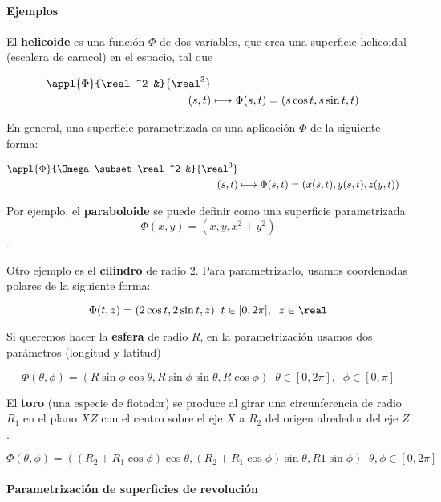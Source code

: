 \paragraph{Ejemplos}

\label{Helicoide}
El \textbf{helicoide} es una función $\Phi$ de dos variables, que crea una superficie helicoidal (escalera de caracol) en el espacio, tal que 

\begin{align*} \appl{\Phi}{\real^2 &}{\real^3} \\
 (s,t) &\longmapsto \Phi(s,t) = (s\cos t, s\sin t, t) \end{align*}
 

En general, una superficie parametrizada es una aplicación $\Phi$ de la siguiente forma:

\begin{align*} \appl{\Phi}{\Omega \subset \real^2 &}{\real^3} \\
 (s,t) &\longmapsto \Phi(s,t) = (x(s,t), y(s,t), z(y,t)) \end{align*}

Por ejemplo, el \textbf{paraboloide} se puede definir como una superficie parametrizada \[\Phi(x,y) = (x,y,x^2+y^2)\].

Otro ejemplo es el \textbf{cilindro} de radio 2. Para parametrizarlo, usamos coordenadas polares de la siguiente forma:

\[ \Phi(t,z) = (2\cos t, 2\sin t, z)\;\;t\in [0, 2\pi],\;\; z\in \real \]

Si queremos hacer la \textbf{esfera} de radio $R$, en la parametrización usamos dos parámetros (longitud y latitud)

\[ \Phi(\theta, \phi) = (R\sin\phi\cos\theta, R\sin\phi\sin\theta, R\cos\phi)\;\; \theta\in[0,2\pi],\;\;\phi\in[0, \pi] \]

El \textbf{toro} (una especie de flotador) se produce al girar una circunferencia de radio $R_1$ en el plano $XZ$ con el centro sobre el eje $X$ a $R_2$ del origen alrededor del eje $Z$.

\[ \Phi(\theta, \phi) = ((R_2+R_1\cos\phi)\cos\theta,(R_2+R_1\cos\phi)\sin \theta,R1\sin \phi)\;\; \theta, \phi \in [0, 2\pi] \]

\paragraph{Parametrización de superficies de revolución}

